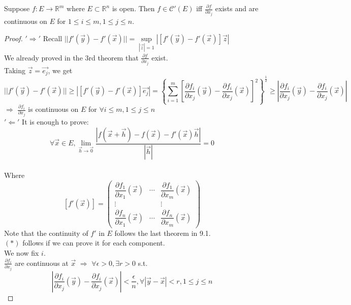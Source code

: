 \begin{theorem}
    Suppose  $ f:E\rightarrow\mathbb{R}^m  $ where  $ E\subset \mathbb{R}^n  $ is open. Then  $ f\in  \mathscr{C}'(E) $ iff  $ \frac{\partial f}{\partial x_j} $ exists and are continuous on  $ E  $ for  $ 1 \leqslant i \leqslant m,1 \leqslant j \leqslant n $.  
\end{theorem}   
\begin{proof}
     $' \Rightarrow' $ Recall  $ ||f'(\vec{y })-f'(\vec{x})||=\sup\limits_{|\vec{z}|=1}|[f'(\vec{y })-f'(\vec{x})]\vec{z}| $\\
     We already proved in the 3rd theorem that  $ \frac{\partial f }{\partial x_j} $ exist.\\
     Taking    $ \vec{z}=\vec{e_j} $, we get \[||f'(\vec{y})-f'(\vec{x})||\geqslant |[f'(\vec{y})-f'(\vec{x})]\vec{e_j}|=\left\{\sum\limits_{i=1}^{m } [\frac{\partial f_i }{\partial x_j}(\vec{y})-\frac{\partial f_i }{\partial x_j}(\vec{x})]^2\right\}^{\frac{1}{2}}\geqslant |\frac{\partial f_i }{\partial x_j}(\vec{y})-\frac{\partial f_i }{\partial x_j}(\vec{x})|\]
      $ \Rightarrow $  $ \frac{\partial f_i }{\partial x_j} $ is continuous on  $ E  $ for  $ \forall  i \leqslant m,1 \leqslant j \leqslant n $\\
       $ '\Leftarrow' $ It is enough to prove: \[ \forall \vec{x}\in E ,\lim\limits_{\vec{h}\to\vec{0}}\dfrac{|f(\vec{x}+\vec{h})-f(\vec{x})-f'(\vec{x})\vec{h}|}{|\vec{h}|} =0  \tag{ $ \ast $ }\]\\
       Where  
       \[
    [f'(\vec{x})]=\begin{pmatrix}
        \dfrac{\partial f_1}{\partial x_1} (\vec{x}) & \cdots &
        \dfrac{\partial f_1}{\partial x_m} (\vec{x}) \\
        \vdots & & \vdots \\
        \dfrac{\partial f_n}{\partial x_1} (\vec{x}) & \cdots &
        \dfrac{\partial f_n}{\partial x_m} (\vec{x})
    \end{pmatrix}
\]
    Note that the continuity of  $ f' $ in  $ E  $ follows the last theorem in 9.1.\\
     $ (\ast ) $ follows if we can prove it for each component.\\
     We now fix  $ i  $. \\
      $ \frac{\partial f_i }{\partial x_j} $ are continuous at  $ \vec{x } $  $ \Rightarrow  $  $ \forall \epsilon>0,\exists r>0  $ s.t.  \[\left|\frac{\partial f_i }{\partial x_j}(\vec{y})-\frac{\partial f_i }{\partial x_j}(\vec{x})\right|<\frac{\epsilon}{n},\forall |\vec{y}-\vec{x}|<r,1 \leqslant j \leqslant n \tag{ $ \ast\ast $ }\]

\end{proof}
